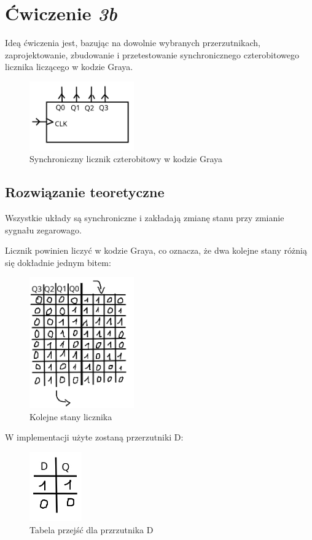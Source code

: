 \documentclass{article}
\begin{document}
\pagebreak
\section{Ćwiczenie \textit{3b}}
Ideą ćwiczenia jest, bazując na dowolnie wybranych przerzutnikach, zaprojektowanie, zbudowanie i przetestowanie synchronicznego
czterobitowego licznika liczącego w kodzie Graya.

\begin{figure}[H]
    \centering
    \includegraphics[width=0.4\textwidth]{3b_idea.jpg}
    \caption{Synchroniczny licznik czterobitowy w kodzie Graya}
\end{figure}

\subsection{Rozwiązanie teoretyczne}
Wszystkie układy są synchroniczne i zakładają zmianę stanu przy zmianie sygnału zegarowago.

Licznik powinien liczyć w kodzie Graya, co oznacza, że dwa kolejne stany różnią się dokładnie jednym bitem:

\begin{figure}[H]
    \centering
    \includegraphics[width=0.4\textwidth]{3b_gray.jpg}
    \caption{Kolejne stany licznika}
\end{figure}

\pagebreak
W implementacji użyte zostaną przerzutniki D:

\begin{figure}[H]
    \centering
    \includegraphics[width=0.2\textwidth]{3b_dtruth.jpg}
    \caption{Tabela przejść dla przrzutnika D}
\end{figure}
\end{document}
